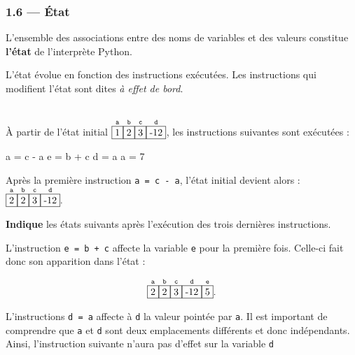 \documentclass[a4paper,17pt]{extarticle}
\newenvironment{eleve}%
{\begin{activite}\color{noiramu}\\[-0.5cm]}
{\end{activite}}
\newenvironment{Shaded}{}{}
\newcommand{\DecValTok}[1]{\textcolor[rgb]{0.25,0.63,0.44}{{#1}}}
\newcommand{\NormalTok}[1]{{#1}}
\newcommand{\OperatorTok}[1]{\textcolor[rgb]{0.40,0.40,0.40}{{#1}}}
\begin{document}
    \hypertarget{uxe9tat}{%
\subsubsection{1.6 --- État}\label{uxe9tat}}
\begin{retenir}
    L'ensemble des associations entre des noms de variables et des valeurs
constitue \textbf{l'état} de l'interprète Python.

        \end{retenir}
    L'état évolue en fonction des instructions exécutées. Les instructions
qui modifient l'état sont dites \emph{à effet de bord}.
\begin{eleve}
    À partir de l'état initial
\(\overset{\texttt{a}}{\fbox{1}}\overset{\texttt{b}}{\fbox{2}}\overset{\texttt{c}}{\fbox{3}}\overset{\texttt{d}}{\fbox{-12}}\),
les instructions suivantes sont exécutées :

\begin{Shaded}
\begin{Highlighting}[]
\NormalTok{a }\OperatorTok{=}\NormalTok{ c }\OperatorTok{{-}}\NormalTok{ a}
\NormalTok{e }\OperatorTok{=}\NormalTok{ b }\OperatorTok{+}\NormalTok{ c}
\NormalTok{d }\OperatorTok{=}\NormalTok{ a}
\NormalTok{a }\OperatorTok{=} \DecValTok{7}
\end{Highlighting}
\end{Shaded}

Après la première instruction \texttt{a\ =\ c\ -\ a}, l'état initial
devient alors :
\(\overset{\texttt{a}}{\fbox{2}}\overset{\texttt{b}}{\fbox{2}}\overset{\texttt{c}}{\fbox{3}}\overset{\texttt{d}}{\fbox{-12}}.\)

\textbf{Indique} les états suivants après l'exécution des trois
dernières instructions.
        
        \end{eleve}\begin{reponse}
    L'instruction \texttt{e\ =\ b\ +\ c} affecte la variable \texttt{e} pour
la première fois. Celle-ci fait donc son apparition dans l'état :

\[
\overset{\texttt{a}}{\fbox{2}}\overset{\texttt{b}}{\fbox{2}}\overset{\texttt{c}}{\fbox{3}}\overset{\texttt{d}}{\fbox{-12}}\overset{\texttt{e}}{\fbox{5}}.
\]

L'instructions \texttt{d\ =\ a} affecte à \texttt{d} la valeur pointée
par \texttt{a}. Il est important de comprendre que \texttt{a} et
\texttt{d} sont deux emplacements différents et donc indépendants.
Ainsi, l'instruction suivante n'aura pas d'effet sur la variable
\texttt{d}


\end{reponse}
\end{document}
